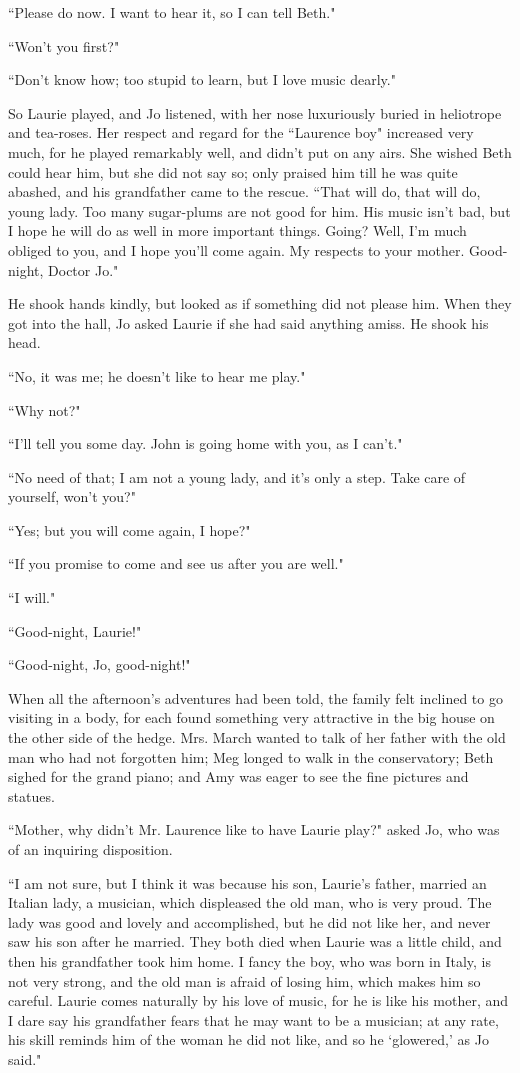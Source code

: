 ``Please do now. I want to hear it, so I can tell Beth."

``Won't you first?"

``Don't know how; too stupid to learn, but I love music
dearly."

So Laurie played, and Jo listened, with her nose luxuriously buried in
heliotrope and tea-roses. Her respect and regard for the ``Laurence boy"
increased very much, for he played remarkably well, and
didn't put on any airs. She wished Beth could hear him,
but she did not say so; only praised him till he was quite abashed, and
his grandfather came to the rescue. ``That will do, that will do, young
lady. Too many sugar-plums are not good for him. His music
isn't bad, but I hope he will do as well in more
important things. Going? Well, I'm much obliged to you,
and I hope you'll come again. My respects to your
mother. Good-night, Doctor Jo."

He shook hands kindly, but looked as if something did not please him.
When they got into the hall, Jo asked Laurie if she had said anything
amiss. He shook his head.

``No, it was me; he doesn't like to hear me play."

``Why not?"

``I'll tell you some day. John is going home with you, as
I can't."

``No need of that; I am not a young lady, and it's only a
step. Take care of yourself, won't you?"

``Yes; but you will come again, I hope?"

``If you promise to come and see us after you are well."

``I will."

``Good-night, Laurie!"

``Good-night, Jo, good-night!"

When all the afternoon's adventures had been told, the
family felt inclined to go visiting in a body, for each found something
very attractive in the big house on the other side of the hedge. Mrs.
March wanted to talk of her father with the old man who had not
forgotten him; Meg longed to walk in the conservatory; Beth sighed for
the grand piano; and Amy was eager to see the fine pictures and statues.

``Mother, why didn't Mr. Laurence like to have Laurie
play?" asked Jo, who was of an inquiring disposition.

``I am not sure, but I think it was because his son,
Laurie's father, married an Italian lady, a musician,
which displeased the old man, who is very proud. The lady was good and
lovely and accomplished, but he did not like her, and never saw his son
after he married. They both died when Laurie was a little child, and
then his grandfather took him home. I fancy the boy, who was born in
Italy, is not very strong, and the old man is afraid of losing him,
which makes him so careful. Laurie comes naturally by his love of music,
for he is like his mother, and I dare say his grandfather fears that he
may want to be a musician; at any rate, his skill reminds him of the
woman he did not like, and so he
`glowered,' as Jo said."

